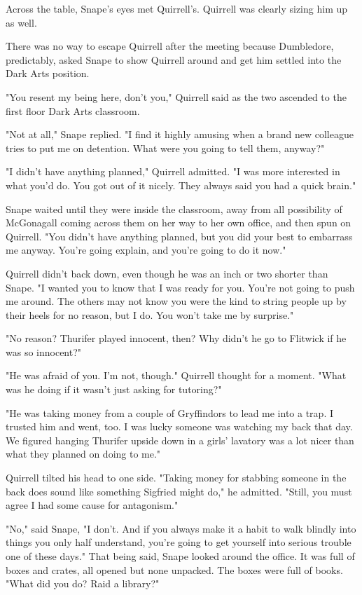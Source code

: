 \documentclass[a4paper,11pt]{article}
\begin{document}
Across the table, Snape's eyes met Quirrell's. Quirrell was clearly sizing him up as well.

There was no way to escape Quirrell after the meeting because Dumbledore, predictably, asked Snape to show Quirrell around and get him settled into the Dark Arts position.

"You resent my being here, don't you," Quirrell said as the two ascended to the first floor Dark Arts classroom.

"Not at all," Snape replied. "I find it highly amusing when a brand new colleague tries to put me on detention. What were you going to tell them, anyway?"

"I didn't have anything planned," Quirrell admitted. "I was more interested in what you'd do. You got out of it nicely. They always said you had a quick brain."

Snape waited until they were inside the classroom, away from all possibility of McGonagall coming across them on her way to her own office, and then spun on Quirrell. "You didn't have anything planned, but you did your best to embarrass me anyway. You're going explain, and you're going to do it now."

Quirrell didn't back down, even though he was an inch or two shorter than Snape. "I wanted you to know that I was ready for you. You're not going to push me around. The others may not know you were the kind to string people up by their heels for no reason, but I do. You won't take me by surprise."

"No reason? Thurifer played innocent, then? Why didn't he go to Flitwick if he was so innocent?"

"He was afraid of you. I'm not, though." Quirrell thought for a moment. "What was he doing if it wasn't just asking for tutoring?"

"He was taking money from a couple of Gryffindors to lead me into a trap. I trusted him and went, too. I was lucky someone was watching my back that day. We figured hanging Thurifer upside down in a girls' lavatory was a lot nicer than what they planned on doing to me."

Quirrell tilted his head to one side. "Taking money for stabbing someone in the back does sound like something Sigfried might do," he admitted. "Still, you must agree I had some cause for antagonism."

"No," said Snape, "I don't. And if you always make it a habit to walk blindly into things you only half understand, you're going to get yourself into serious trouble one of these days." That being said, Snape looked around the office. It was full of boxes and crates, all opened but none unpacked. The boxes were full of books. "What did you do? Raid a library?"
\end{document}
